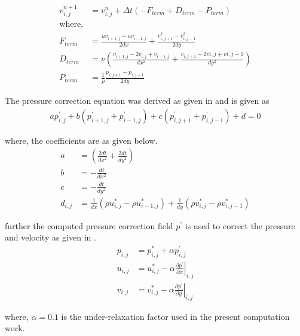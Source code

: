 \begin{align}
    v_{i,j}^{n+1} &= v_{i,j}^{n} + \Delta t \left(-F_{term} + D_{term} - P_{term}\right) \label{y_mmtm_discretized} \\
    \text{where,} \nonumber \\
    F_{term} &= \frac{uv_{i+1,j} - uv_{i-1,j}}{2 dx} + \frac{v_{i,j+1}^2 - v_{i,j-1}^2}{2 dy} \nonumber \\
    D_{term} & = \nu \left(\frac{v_{i+1,j} - 2 v_{i,j} + v_{i-1,j}}{dx^2} + \frac{v_{i,j+1} - 2 v{i,j} + v{i,j-1}}{dy^2}\right) \nonumber \\
    P_{term} &= \frac{1}{\rho}\frac{p_{i,j+1} - p_{i,j-1}}{2 dy} \nonumber
\end{align}

\par The pressure correction equation was derived as given in \cite{ref_1} and
is given as 
\begin{align}
    a p^{\prime}_{i,j} + b (p^{\prime}_{i+1,j}  + p^{\prime}_{i-1,j}) + c (p^{\prime}_{i,j+1} + p^{\prime}_{i,j-1}) + d = 0 \label{pp_eqn}
\end{align}

\par where, the coefficients are as given below.
\begin{align*}
    a &= \left(\frac{2 dt}{dx^2} + \frac{2 dt}{dy^2}\right) \\
    b &= - \frac{dt}{dx^2} \\
    c &= - \frac{dt}{dy^2} \\
    d_{i,j} &= \frac{1}{dx}\left(\rho u^*_{i,j} - \rho u^*_{i-1,j}\right) + \frac{1}{dy} \left(\rho v^*_{i,j} -\rho v^*_{i,j-1}\right)
\end{align*}

\par further the computed pressure correction field \(p^{\prime}\) is used to
correct the pressure and velocity as given in .
\begin{align}
    p_{i,j} &= p_{i,j}^* + \alpha p_{i,j}^{\prime} \label{p_cor_eqn} \\
    u_{i,j} &= u_{i,j}^* - \alpha \left.\frac{\partial p^{\prime}}{\partial x}\right\vert_{i,j} \label{u_cor_eqn} \\
    v_{i,j} &= v_{i,j}^* - \alpha \left.\frac{\partial p^{\prime}}{\partial y}\right\vert_{i,j} \label{v_cor_eqn}
\end{align}

\par where, \(\alpha = 0.1 \) is the under-relaxation factor used in the present
computation work.\\

